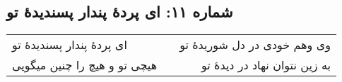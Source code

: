 \begin{center}
\section*{شماره ۱۱: ای پردۀ پندار پسندیدۀ تو}
\label{sec:011}
\begin{longtable}{l p{0.5cm} r}
ای پردهٔ پندار پسندیدهٔ تو
&&
وی وهم خودی در دل شوریدهٔ تو
\\
هیچی تو و هیچ را چنین میگویی
&&
به زین نتوان نهاد در دیدهٔ تو
\\
\end{longtable}
\end{center}
